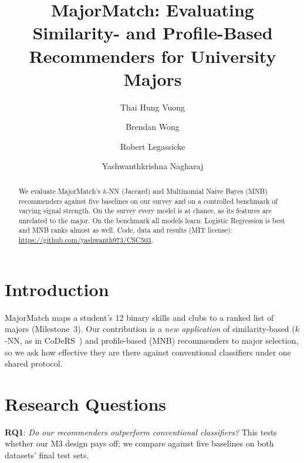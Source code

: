 \documentclass[sigconf]{acmart}
\newcommand{\RQ}[1]{\textbf{RQ#1}}
\begin{document}
\title{MajorMatch: Evaluating Similarity- and Profile-Based Recommenders for University Majors}

\author{Thai Hung Vuong}
\author{Brendan Wong}
\author{Robert Legassicke}
\author{Yashwanthkrishna Nagharaj}

\begin{abstract}
We evaluate MajorMatch's $k$-NN (Jaccard) and Multinomial Naive Bayes (MNB) recommenders against five baselines on our survey and on a controlled benchmark of varying signal strength. On the survey every model is at chance, as its features are unrelated to the major. On the benchmark all models learn: Logistic Regression is best and MNB ranks almost as well. Code, data and results (MIT license): \url{https://github.com/yashwanth973/CSC503}.
\end{abstract}

\maketitle

\section{Introduction}
MajorMatch maps a student's 12 binary skills and clubs to a ranked list of majors (Milestone~3). Our contribution is a \emph{new application} of similarity-based ($k$-NN, as in CoDeRS~\cite{rances2026coders}) and profile-based (MNB) recommenders to major selection, so we ask how effective they are there against conventional classifiers under one shared protocol.

\section{Research Questions}
\noindent\RQ{1}: \emph{Do our recommenders outperform conventional classifiers?} This tests whether our M3 design pays off; we compare against five baselines on both datasets' final test sets.
\end{document}
